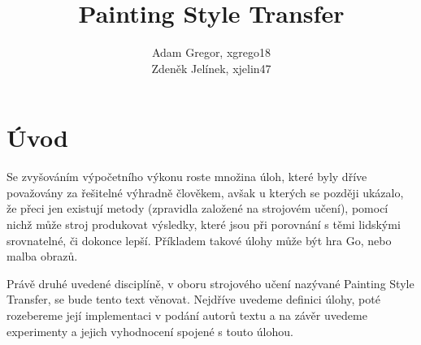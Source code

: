 \documentclass[twocolumn]{article}
\title{\Huge Painting Style Transfer}
\author{Adam Gregor, xgrego18 \\
	Zdeněk Jelínek, xjelin47
}
\begin{document}
	\maketitle
	
	\section*{Úvod}
	Se zvyšováním výpočetního výkonu roste množina úloh, které byly dříve považovány za řešitelné výhradně člověkem, avšak u kterých se později ukázalo, že přeci jen existují metody (zpravidla založené na strojovém učení), pomocí nichž může stroj produkovat výsledky, které jsou při porovnání s těmi lidskými srovnatelné, či dokonce lepší. Příkladem takové úlohy může být hra Go, nebo malba obrazů. 
	\par
	Právě druhé uvedené disciplíně, v oboru strojového učení nazývané Painting Style Transfer, se bude tento text věnovat. Nejdříve uvedeme definici úlohy, poté rozebereme její implementaci v podání autorů textu a na závěr uvedeme experimenty a jejich vyhodnocení spojené s touto úlohou.
	
\end{document}
